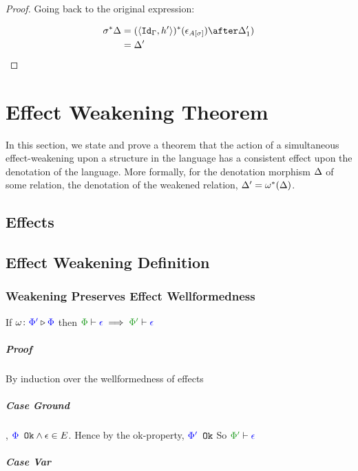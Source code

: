 \documentclass{report}
\begin{document}
\begin{framed}
\begin{proof}
    Going back to the original expression:
    
    \begin{align*}
        \si\star{\D} & = (\pr{\Id{\G}}{h'})\star(\e_{A\ssi})\after\D_1')\\
        & = \D'\\
    \end{align*}
    
    \end{proof}
    
\end{framed}
\chapter{Effect Weakening Theorem}
In this section, we state and prove a theorem that the action of a simultaneous effect-weakening upon a structure in the language has a consistent effect upon the denotation of the language. More formally, for the denotation morphism $\Delta$ of some relation, the denotation of the weakened relation, $\Delta' = \omega^*(\Delta)$.

\section{Effects}
\section{Effect Weakening Definition}
   

   
    \subsection{Weakening Preserves Effect Wellformedness}
    If $\omega \colon {\color{blue}\Phi'} \triangleright {\color {blue} \Phi}$ then $\wellformed{\P}{\e}\implies\wellformed{\P'}{\e}$

    \paragraph{Proof}
    By induction over the wellformedness of effects
    \paragraph{Case Ground}
    \bi, ${\color{blue} \Phi} \texttt{ Ok}\wedge\epsilon\in E$.
    Hence by the ok-property, ${\color{blue} \Phi'} \texttt{ Ok}$
    So $\wellformed{\P'}{\e}$

    \paragraph{Case Var}
\end{document}
